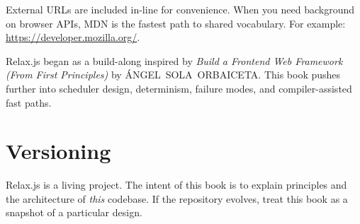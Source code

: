 External URLs are included in-line for convenience.
When you need background on browser APIs, MDN is the fastest path to shared vocabulary.
For example: \href{https://developer.mozilla.org/}{https://developer.mozilla.org/}.

Relax.js began as a build-along inspired by \textit{Build a Frontend Web Framework (From First Principles)} by \textsc{\mbox{\hspace{0.2em}ÁNGEL SOLA ORBAICETA}}.
This book pushes further into scheduler design, determinism, failure modes, and compiler-assisted fast paths.

\section*{Versioning}

Relax.js is a living project.
The intent of this book is to explain principles and the architecture of \emph{this} codebase.
If the repository evolves, treat this book as a snapshot of a particular design.
